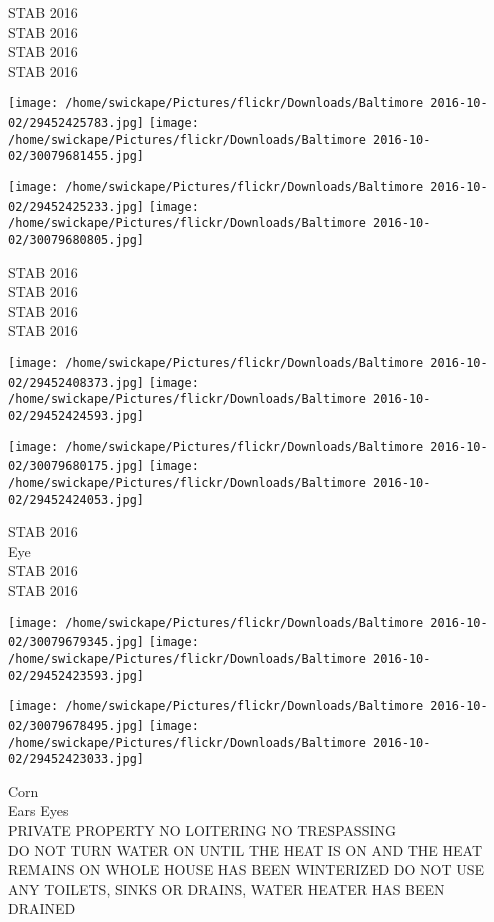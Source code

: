\documentclass[10pt,letterpaper]{article}
\begin{document}
STAB 2016\\
STAB 2016\\
STAB 2016\\
STAB 2016
\pagebreak

\texttt{[image: /home/swickape/Pictures/flickr/Downloads/Baltimore 2016-10-02/29452425783.jpg]}
\texttt{[image: /home/swickape/Pictures/flickr/Downloads/Baltimore 2016-10-02/30079681455.jpg]}

\texttt{[image: /home/swickape/Pictures/flickr/Downloads/Baltimore 2016-10-02/29452425233.jpg]}
\texttt{[image: /home/swickape/Pictures/flickr/Downloads/Baltimore 2016-10-02/30079680805.jpg]}

STAB 2016\\
STAB 2016\\
STAB 2016\\
STAB 2016
\pagebreak

\texttt{[image: /home/swickape/Pictures/flickr/Downloads/Baltimore 2016-10-02/29452408373.jpg]}
\texttt{[image: /home/swickape/Pictures/flickr/Downloads/Baltimore 2016-10-02/29452424593.jpg]}

\texttt{[image: /home/swickape/Pictures/flickr/Downloads/Baltimore 2016-10-02/30079680175.jpg]}
\texttt{[image: /home/swickape/Pictures/flickr/Downloads/Baltimore 2016-10-02/29452424053.jpg]}

STAB 2016\\
Eye\\
STAB 2016\\
STAB 2016
\pagebreak

\texttt{[image: /home/swickape/Pictures/flickr/Downloads/Baltimore 2016-10-02/30079679345.jpg]}
\texttt{[image: /home/swickape/Pictures/flickr/Downloads/Baltimore 2016-10-02/29452423593.jpg]}

\texttt{[image: /home/swickape/Pictures/flickr/Downloads/Baltimore 2016-10-02/30079678495.jpg]}
\texttt{[image: /home/swickape/Pictures/flickr/Downloads/Baltimore 2016-10-02/29452423033.jpg]}

Corn\\
Ears Eyes\\
PRIVATE PROPERTY NO LOITERING NO TRESPASSING\\
DO NOT TURN WATER ON UNTIL THE HEAT IS ON AND THE HEAT REMAINS ON WHOLE HOUSE HAS BEEN WINTERIZED DO NOT USE ANY TOILETS, SINKS OR DRAINS, WATER HEATER HAS BEEN DRAINED
\pagebreak
\end{document}
